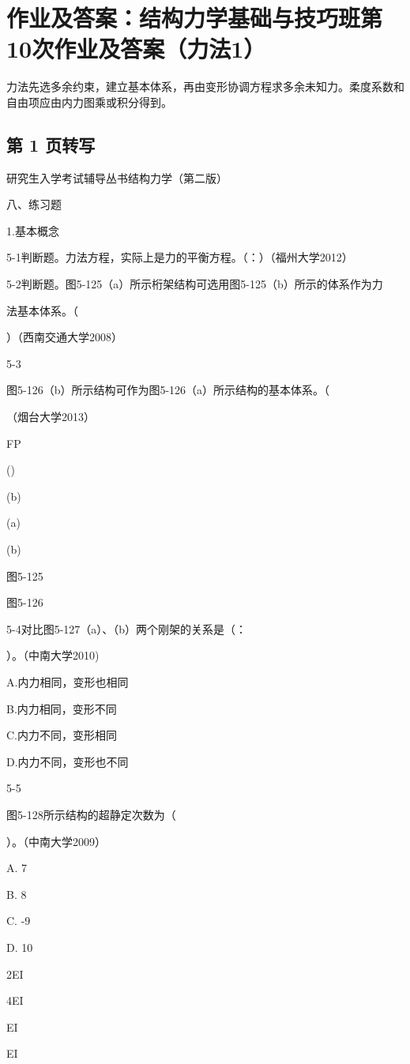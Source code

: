 \section{作业及答案：结构力学基础与技巧班第10次作业及答案（力法1）}
\begin{analysisbox}
力法先选多余约束，建立基本体系，再由变形协调方程求多余未知力。柔度系数和自由项应由内力图乘或积分得到。
\end{analysisbox}
\subsection*{第 1 页转写}
研究生入学考试辅导丛书结构力学（第二版）

八、练习题

1.基本概念

5-1判断题。力法方程，实际上是力的平衡方程。（：）（福州大学2012）

5-2判断题。图5-125（a）所示桁架结构可选用图5-125（b）所示的体系作为力

法基本体系。（

）（西南交通大学2008）

5-3

图5-126（b）所示结构可作为图5-126（a）所示结构的基本体系。（

（烟台大学2013）

FP

()

(b)

(a)

(b)

图5-125

图5-126

5-4对比图5-127（a）、（b）两个刚架的关系是（：

）。（中南大学2010)

A.内力相同，变形也相同

B.内力相同，变形不同

C.内力不同，变形相同

D.内力不同，变形也不同

5-5

图5-128所示结构的超静定次数为（

）。（中南大学2009）

A. 7

B. 8

C. -9

D. 10

2EI

4EI

EI

EI

